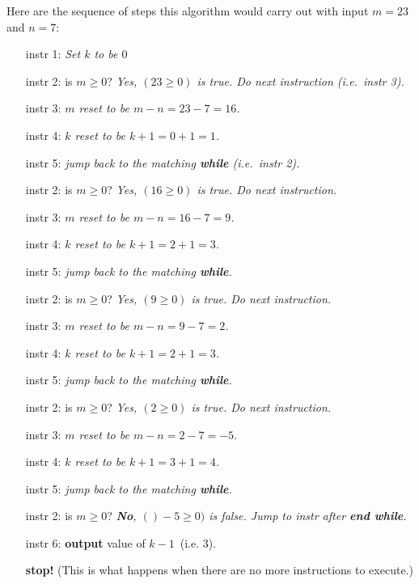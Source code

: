 \begin{exmp}
\noindent Here are the sequence of steps this algorithm would carry out with input $m = 23$ and $n=7$:
\qquad[initial status. $m=23$, $n=7$, $k=\text{(undefined)}$]
\begin{enumerate}\itemsep0pt
 \item[instr 1:] \emph{Set $k$ to be $0$} \qquad[status: $m=23$, $n=7$, $k=0$]
 \item[instr 2:] is $m\geq 0$? \emph{Yes, $(23\geq0)$ is true. 
    Do next instruction (i.e.~instr 3).}
 \item[instr 3:] \emph{$m$ reset to be $m-n=23-7=16$.} \quad[status: $m=16$, $n=7$, $k=0$]
 \item[instr 4:] \emph{$k$ reset to be $k+1=0+1=1$.} \qquad[status: $m=16$, $n=7$, $k=1$]
 \item[instr 5:] \emph{jump back to the matching \textbf{while} (i.e.~instr 2).}
 \item[instr 2:] is $m \geq 0$? \emph{Yes, $(16\geq0)$ is true. Do next instruction.} 
 \item[instr 3:] \emph{$m$ reset to be $m-n=16-7=9$.} \qquad[status: $m=9$, $n=7$, $k=1$]
 \item[instr 4:] \emph{$k$ reset to be $k+1=2+1=3$.} \qquad[status: $m=9$, $n=7$, $k=2$]
 \item[instr 5:]\emph{ jump back to the matching \textbf{while}.} 
 \item[instr 2:] is $m \geq 0$? \emph{Yes, $(9\geq0)$ is true. Do next instruction. } 
 \item[instr 3:] \emph{$m$ reset to be $m-n=9-7=2$.} \qquad[status: $m=2$, $n=7$, $k=2$]
 \item[instr 4:] \emph{$k$ reset to be $k+1=2+1=3$.} \qquad[status: $m=2$, $n=7$, $k=3$]
 \item[instr 5:] \emph{jump back to the matching \textbf{while}.}
 \item[instr 2:] is $m \geq 0$? \emph{Yes, $(2\geq0)$ is true. Do next instruction.} 
 \item[instr 3:] \emph{$m$ reset to be $m-n=2-7=-5$.} \qquad[status: $m=-5$, $n=7$, $k=2$]
 \item[instr 4:] \emph{$k$ reset to be $k+1=3+1=4$.} \qquad[status: $m=-5$, $n=7$, $k=4$]
 \item[instr 5:] \emph{jump back to the matching \textbf{while}.}
 \item[instr 2:] is $m \geq 0$? \emph{\textbf{No}, $()-5\geq0)$ is false. 
                 Jump to instr after \textbf{end while}.}  
 \item[instr 6:] \textbf{output} value of $k-1$~(i.e. $3$). 
                           \qquad[status: $m=-5$, $n=7$, $k=4$]        
 \item[\bfseries stop!] \qquad(This is what happens when there are no more instructions to execute.)                               
\end{enumerate}


\end{exmp}
